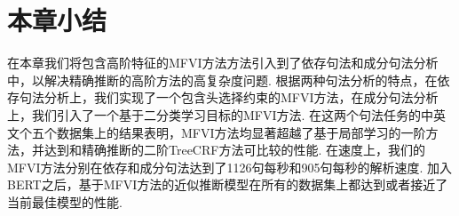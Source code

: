 \section{本章小结}

在本章我们将包含高阶特征的MFVI方法方法引入到了依存句法和成分句法分析中，以解决精确推断的高阶方法的高复杂度问题.
根据两种句法分析的特点，在依存句法分析上，我们实现了一个包含头选择约束的MFVI方法，在成分句法分析上，我们引入了一个基于二分类学习目标的MFVI方法.
在这两个句法任务的中英文个五个数据集上的结果表明，MFVI方法均显著超越了基于局部学习的一阶方法，并达到和精确推断的二阶TreeCRF方法可比较的性能.
在速度上，我们的MFVI方法分别在依存和成分句法达到了1126句每秒和905句每秒的解析速度.
加入BERT之后，基于MFVI方法的近似推断模型在所有的数据集上都达到或者接近了当前最佳模型的性能.
